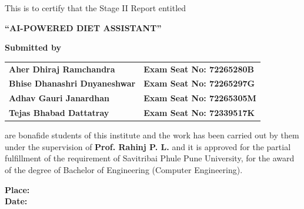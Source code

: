 \documentclass[12pt,a4paper]{report}
\newcommand{\ProjectTitle}{AI-POWERED DIET ASSISTANT}
\newcommand{\GuideName}{Prof. Rahinj P. L.}
\newcommand{\StudentOne}{Aher Dhiraj Ramchandra}
\newcommand{\StudentTwo}{Bhise Dhanashri Dnyaneshwar}
\newcommand{\StudentThree}{Adhav Gauri Janardhan}
\newcommand{\StudentFour}{Tejas Bhabad Dattatray}
\newcommand{\SeatOne}{72265280B}
\newcommand{\SeatTwo}{72265297G}
\newcommand{\SeatThree}{72265305M}
\newcommand{\SeatFour}{72339517K}
\begin{document}
\noindent\centering This is to certify that the Stage II Report entitled
\begin{center}
  {\large\textbf{“\ProjectTitle”}}
\end{center}
\textbf{Submitted by}
\begin{center}
\begin{tabular}{l l}
\textbf{\StudentOne} & \textbf{Exam Seat No: \SeatOne} \\
\textbf{\StudentTwo} & \textbf{Exam Seat No: \SeatTwo} \\
\textbf{\StudentThree} & \textbf{Exam Seat No: \SeatThree} \\
\textbf{\StudentFour} & \textbf{Exam Seat No: \SeatFour} \\
\end{tabular}
\end{center}
are bonafide students of this institute and the work has been carried out by them under the supervision of \textbf{\GuideName} and it is approved for the partial fulfillment of the requirement of Savitribai Phule Pune University, for the award of the degree of Bachelor of Engineering (Computer Engineering).

\vspace{12pt}
\noindent
\begin{minipage}[t]{0.46\textwidth}
  \textbf{Place:}\\[4pt]
  \textbf{Date:}\\[4pt]
\end{minipage}
\hfill
\vspace{8mm}
\end{document}
